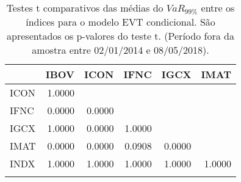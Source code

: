 \begin{longtable}{lrrrrr}
\caption{Testes t comparativos das médias do $VaR_{99\%}$ entre os índices para o modelo EVT condicional.
São apresentados os p-valores do teste t.  
             (Período fora da amostra entre 02/01/2014 e 08/05/2018).} \\ 
  \toprule
 & IBOV & ICON & IFNC & IGCX & IMAT \\ 
  \midrule
ICON & 1.0000 &  &  &  &  \\ 
  IFNC & 0.0000 & 0.0000 &  &  &  \\ 
  IGCX & 1.0000 & 0.0000 & 1.0000 &  &  \\ 
  IMAT & 0.0000 & 0.0000 & 0.0908 & 0.0000 &  \\ 
  INDX & 1.0000 & 1.0000 & 1.0000 & 1.0000 & 1.0000 \\ 
   \bottomrule
\label{tab:t_test}
\end{longtable}
